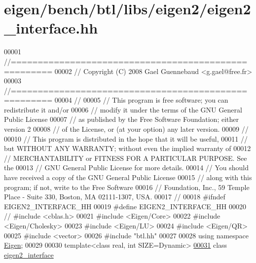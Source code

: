 \hypertarget{eigen_2bench_2btl_2libs_2eigen2_2eigen2__interface_8hh_source}{}\section{eigen/bench/btl/libs/eigen2/eigen2\+\_\+interface.hh}
\label{eigen_2bench_2btl_2libs_2eigen2_2eigen2__interface_8hh_source}

\begin{DoxyCode}
00001 \textcolor{comment}{//=====================================================}
00002 \textcolor{comment}{// Copyright (C) 2008 Gael Guennebaud <g.gael@free.fr>}
00003 \textcolor{comment}{//=====================================================}
00004 \textcolor{comment}{//}
00005 \textcolor{comment}{// This program is free software; you can redistribute it and/or}
00006 \textcolor{comment}{// modify it under the terms of the GNU General Public License}
00007 \textcolor{comment}{// as published by the Free Software Foundation; either version 2}
00008 \textcolor{comment}{// of the License, or (at your option) any later version.}
00009 \textcolor{comment}{//}
00010 \textcolor{comment}{// This program is distributed in the hope that it will be useful,}
00011 \textcolor{comment}{// but WITHOUT ANY WARRANTY; without even the implied warranty of}
00012 \textcolor{comment}{// MERCHANTABILITY or FITNESS FOR A PARTICULAR PURPOSE.  See the}
00013 \textcolor{comment}{// GNU General Public License for more details.}
00014 \textcolor{comment}{// You should have received a copy of the GNU General Public License}
00015 \textcolor{comment}{// along with this program; if not, write to the Free Software}
00016 \textcolor{comment}{// Foundation, Inc., 59 Temple Place - Suite 330, Boston, MA  02111-1307, USA.}
00017 \textcolor{comment}{//}
00018 \textcolor{preprocessor}{#ifndef EIGEN2\_INTERFACE\_HH}
00019 \textcolor{preprocessor}{#define EIGEN2\_INTERFACE\_HH}
00020 \textcolor{comment}{// #include <cblas.h>}
00021 \textcolor{preprocessor}{#include <Eigen/Core>}
00022 \textcolor{preprocessor}{#include <Eigen/Cholesky>}
00023 \textcolor{preprocessor}{#include <Eigen/LU>}
00024 \textcolor{preprocessor}{#include <Eigen/QR>}
00025 \textcolor{preprocessor}{#include <vector>}
00026 \textcolor{preprocessor}{#include "btl.hh"}
00027 
00028 \textcolor{keyword}{using namespace }\hyperlink{namespace_eigen}{Eigen};
00029 
00030 \textcolor{keyword}{template}<\textcolor{keyword}{class} real, \textcolor{keywordtype}{int} SIZE=Dynamic>
\hyperlink{classeigen2__interface}{00031} \textcolor{keyword}{class }\hyperlink{classeigen2__interface}{eigen2\_interface}

\end{DoxyCode}
